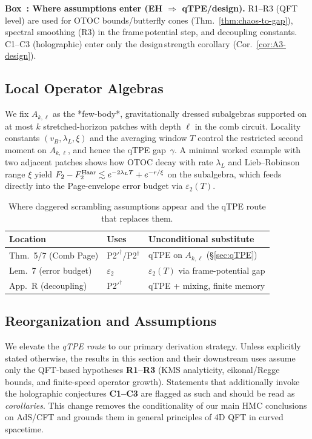 \documentclass[11pt,a4paper]{article}
\newcounter{boxedresult}
\newenvironment{boxedresult}[1]{\refstepcounter{boxedresult}\begin{infobox}\noindent\textbf{Box~\theboxedresult: #1.}}{\end{infobox}}
\theoremstyle{plain}
\theoremstyle{definition}
\theoremstyle{remark}
\begin{document}
\begin{boxedresult}{Where assumptions enter (EH $\Rightarrow$ qTPE/design)}\small
R1--R3 (QFT\,level) are used for OTOC bounds/butterfly cones (Thm.~\ref{thm:chaos-to-gap}), spectral smoothing (R3) in the frame\,potential step, and decoupling constants. C1--C3 (holographic) enter only the design\,strength corollary (Cor.~\ref{cor:A3-design}).
\end{boxedresult}

\subsection{Local Operator Algebras}
We fix $A_{k,\ell}$ as the *few-body*, gravitationally dressed subalgebras supported on at
most $k$ stretched-horizon patches with depth $\ell$ in the comb circuit. Locality constants
$(v_B,\lambda_L,\xi)$ and the averaging window $T$ control the restricted second moment on
$A_{k,\ell}$, and hence the qTPE gap~$\gamma$. A minimal worked example with two adjacent
patches shows how OTOC decay with rate $\lambda_L$ and Lieb–Robinson range $\xi$ yield
$F_2- F^{\rm Haar}_2 \lesssim e^{-2\lambda_L T}+e^{-r/\xi}$ on the subalgebra, which feeds
directly into the Page-envelope error budget via $\varepsilon_2(T)$.

\begin{table}[t]
  \centering
  \small
  \begin{tabular}{l l l}
    \hline
    Location & Uses & Unconditional substitute \\
    \hline
    Thm.~5/7 (Comb Page) & P2$'^{\dagger}$/P2$^{\dagger}$ & qTPE on $A_{k,\ell}$ (\S\ref{sec:qTPE}) \\
    Lem.~7 (error budget) & $\varepsilon_2$ & $\varepsilon_2(T)$ via frame-potential gap \\
    App.~R (decoupling) & P2$'^{\dagger}$ & qTPE + mixing, finite memory \\
    \hline
  \end{tabular}
  \caption{Where daggered scrambling assumptions appear and the qTPE route that replaces them.}
  \label{tab:dagger-map}
\end{table}

\subsection{Reorganization and Assumptions}
We elevate the \emph{qTPE route} to our primary derivation strategy.
Unless explicitly stated otherwise, the results in this section and their downstream uses assume only the QFT-based hypotheses \textbf{R1--R3} (KMS analyticity, eikonal/Regge bounds, and finite-speed operator growth).
Statements that additionally invoke the holographic conjectures \textbf{C1--C3} are flagged as such and should be read as \emph{corollaries}.
This change removes the conditionality of our main HMC conclusions on AdS/CFT and grounds them in general principles of 4D QFT in curved spacetime.
\end{document}
